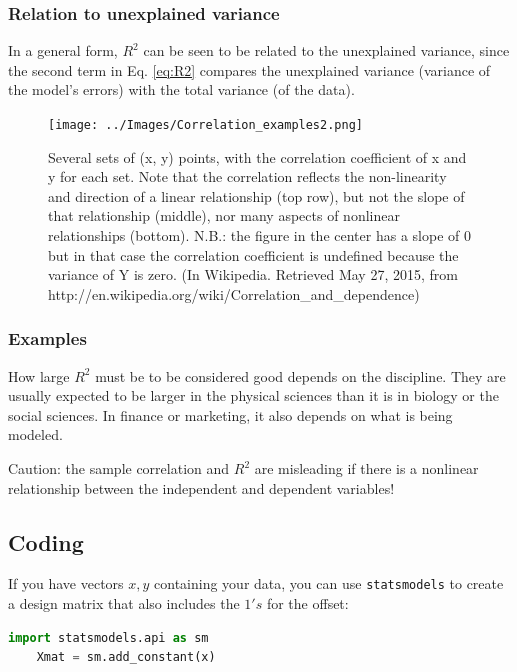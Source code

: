\subsubsection{Relation to unexplained variance}

In a general form, $R^2$ can be seen to be related to the unexplained variance, since the second term in Eq. \ref{eq:R2} compares the unexplained variance (variance of the model's errors) with the total variance (of the data).

\begin{figure}
  \centering
  \texttt{[image: ../Images/Correlation\_examples2.png]}\\
  \caption{Several sets of (x, y) points, with the correlation coefficient of x and y for each set. Note that the correlation reflects the non-linearity and direction of a linear relationship (top row), but not the slope of that relationship (middle), nor many aspects of nonlinear relationships (bottom). N.B.: the figure in the center has a slope of 0 but in that case the correlation coefficient is undefined because the variance of Y is zero. (In Wikipedia. Retrieved May 27, 2015, from http://en.wikipedia.org/wiki/Correlation\_and\_dependence)}\label{fig:correlation}
\end{figure}

\subsubsection{Examples}

How large $R^2$ must be to be considered good depends on the discipline. They are usually expected to be larger in the physical sciences than it is in biology or the social sciences. In finance or marketing, it also depends on what is being modeled.

Caution: the sample correlation and $R^2$ are misleading if there is a nonlinear relationship between the independent and dependent variables!


\subsection{Coding}

If you have vectors $x,y$ containing your data, you can use \texttt{statsmodels} to create a design matrix that also includes the $1's$ for the offset:

\begin{lstlisting}[language=Python]
    import statsmodels.api as sm
    Xmat = sm.add_constant(x)
\end{lstlisting}

